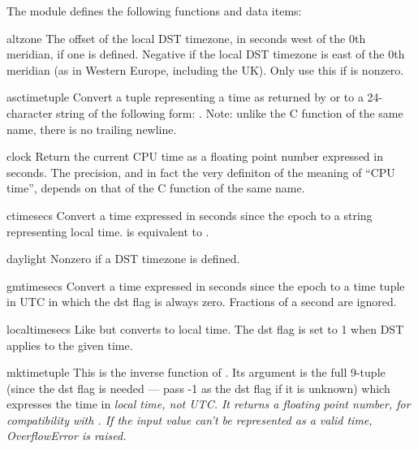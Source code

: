 The module defines the following functions and data items:

\renewcommand{\indexsubitem}{(in module time)}

\begin{datadesc}{altzone}
The offset of the local DST timezone, in seconds west of the 0th
meridian, if one is defined.  Negative if the local DST timezone is
east of the 0th meridian (as in Western Europe, including the UK).
Only use this if  is nonzero.
\end{datadesc}

\begin{funcdesc}{asctime}{tuple}
Convert a tuple representing a time as returned by  or
 to a 24-character string of the following form:
.  Note: unlike the C function of
the same name, there is no trailing newline.
\end{funcdesc}

\begin{funcdesc}{clock}{}
Return the current CPU time as a floating point number expressed in
seconds.  The precision, and in fact the very definiton of the meaning
of ``CPU time'', depends on that of the C function of the same name.
\end{funcdesc}

\begin{funcdesc}{ctime}{secs}
Convert a time expressed in seconds since the epoch to a string
representing local time.   is equivalent to
.
\end{funcdesc}

\begin{datadesc}{daylight}
Nonzero if a DST timezone is defined.
\end{datadesc}

\begin{funcdesc}{gmtime}{secs}
Convert a time expressed in seconds since the epoch to a time tuple
in UTC in which the dst flag is always zero.  Fractions of a second are
ignored.
\end{funcdesc}

\begin{funcdesc}{localtime}{secs}
Like  but converts to local time.  The dst flag is set
to 1 when DST applies to the given time.
\end{funcdesc}

\begin{funcdesc}{mktime}{tuple}
This is the inverse function of .  Its argument is the
full 9-tuple (since the dst flag is needed --- pass -1 as the dst flag if
it is unknown) which expresses the time
in \em{local} time, not UTC.  It returns a floating
point number, for compatibility with .  If the input
value can't be represented as a valid time, OverflowError is raised.
\end{funcdesc}

